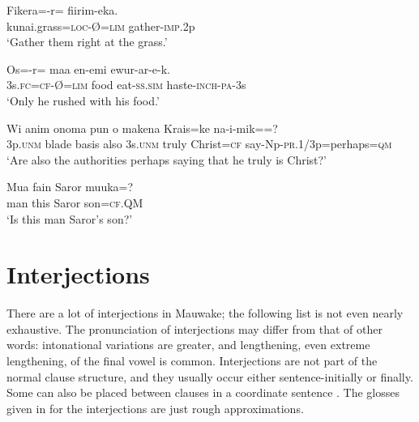 \ea%
\label{ex:3:x795}
\gll Fikera=-r= fiirim-eka. \\
kunai.grass=\textsc{loc}-{\O}=\textsc{lim} gather-\textsc{imp}.2p\\
\glt`Gather them right at the  grass.'
\z

\ea%
\label{ex:3:x796}
\gll Os=-r= maa en-emi ewur-ar-e-k. \\
3s.\textsc{fc}=\textsc{cf}-{\O}=\textsc{lim} food eat-\textsc{ss}.\textsc{sim} haste-\textsc{inch}-\textsc{pa}-3s\\
\glt`Only he rushed with his food.'
\z

\ea%
\label{ex:3:x793}
\gll Wi anim onoma pun o makena Krais=ke na-i-mik==?\\
3p.\textsc{unm} blade basis also 3s.\textsc{unm} truly Christ=\textsc{cf} say-Np-\textsc{pr}.1/3p=perhaps=\textsc{qm}\\
\glt`Are also the authorities perhaps saying that he truly is Christ?'
\z

\ea%
\label{ex:3:x794}
\gll Mua fain Saror muuka=? \\
man this Saror son=\textsc{cf}.QM\\
\glt`Is this man Saror's son?'
\z

\section{Interjections}\label{sec:3:13}
{}
There are a lot of interjections in Mauwake; the following list is not even nearly exhaustive. The pronunciation of interjections may differ from that of other words: intonational variations are greater, and lengthening, even extreme lengthening, of the final vowel is common. Interjections are not part of the normal clause structure, and they usually occur either sentence-initially or finally. Some can also be placed between clauses in a coordinate sentence . The glosses given in  for the interjections are just rough approximations. 

